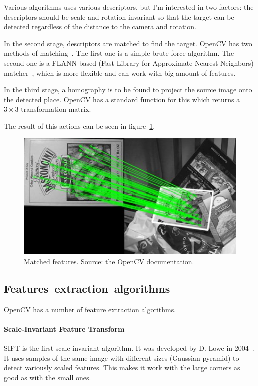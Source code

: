 \documentclass[12pt]{article}
\begin{document}
    Various algorithms uses various descriptors, but 
    I'm interested in two factors: the descriptors should be scale
    and rotation invariant so that the target can be detected
    regardless of the distance to the camera and rotation.

    In the second stage, descriptors are matched to find the target. OpenCV has two methods
    of matching~\cite{MatchingAndHomography}.
    The first one is a simple brute force algorithm.
    The second one is a FLANN-based
    (Fast Library for Approximate Nearest Neighbors) matcher~\cite{FLANN},
    which is more flexible and can work with big amount of features.

    In the third stage, a homography is to be found to project the source image
    onto the detected place. OpenCV has a standard function for this which
    returns a $3\times3$ transformation matrix.

    The result of this actions can be seen in figure~\ref{fig:match}.

    \begin{figure}[htbp]
        \noindent\centering
            \includegraphics[width=.7\textwidth]{homography_findobj.jpg}
        \caption{Matched features. Source: the OpenCV documentation.}
        \label{fig:match}
    \end{figure}

    \subsection{Features~extraction~algorithms}

    OpenCV has a number of feature extraction algorithms.

    \paragraph{Scale-Invariant Feature Transform}
    SIFT is the first scale-invariant algorithm. It was developed by 
    D. Lowe in 2004~\cite{SIFT, pySIFT}. It uses samples of the same image
    with different sizes (Gaussian pyramid) to detect variously scaled features.
    This makes it work with the large corners as good as with the small ones.
\end{document}
